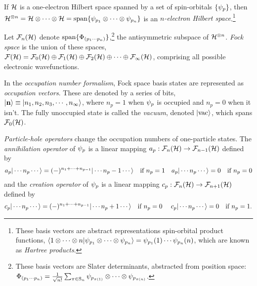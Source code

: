 \documentclass[11pt]{article}
\numberwithin{equation}{section}
\begin{document}
\begin{dfn}
If $\mathcal{H}$ is a one-electron Hilbert space spanned by a set of spin-orbitals $\{\psi _p\}$, then $\mathcal{H}^{\otimes n}=\mathcal{H}\otimes\cdots\otimes\mathcal{H}=\mathrm{span}\{\psi _{p_1}{}\otimes\cdots\otimes\psi _{p_n}\}$ is an \textit{$n$-electron Hilbert space}.\footnote{These basis vectors are abstract representations spin-orbital product functions, $\langle1\otimes\cdots\otimes n|\psi _{p_1}\otimes\cdots\otimes\psi _{p_n}\rangle=\psi _{p_1}(1)\cdots\psi _{p_n}(n)$, which are known as \textit{Hartree products}.}
\end{dfn}


\begin{dfn}\label{dfn:fock-space}
Let $\mathcal{F}_n(\mathcal{H})$ denote $\mathrm{span}\{\Phi _{(p_1\cdots p_n)}\}$,\footnote{
These basis vectors are Slater determinants, abstracted from position space:
$
  \F_{(p_1\cd p_n)}
=
  \fr{1}{\sqrt{n!}}
  \sum_{\pi\in\mr{S}_n}
  \y_{p_{\pi(1)}}\otimes\cd\otimes
  \y_{p_{\pi(n)}}
$.
}
the antisymmetric subspace of $\mathcal{H}^{\otimes n}$.
\textit{Fock space} is the union of these spaces, $\mathcal{F}(\mathcal{H})=\mathcal{F}_0(\mathcal{H})\oplus \mathcal{F}_1(\mathcal{H})\oplus \mathcal{F}_2(\mathcal{H})\oplus\cdots\oplus \mathcal{F}_{\infty}(\mathcal{H})$, comprising all possible electronic wavefunctions.
\end{dfn}

\begin{dfn}\label{occupation-number-representation}
In the \textit{occupation number formalism}, Fock space basis states are represented as \textit{occupation vectors}.
These are denoted by a series of bits,
$
  |\mathbf{n}\rangle
\equiv
  |n_1,n_2,n_3,\cdots,n_\infty\rangle
$,
where $n_p=1$ when $\psi _p$ is occupied and $n_p=0$ when it isn't.
The fully unoccupied state is called the \textit{vacuum}, denoted $|\mathrm{vac}\rangle$, which spans $\mathcal{F}_0(\mathcal{H})$.
\end{dfn}

\begin{dfn}\label{dfn:particle-hole-operators}
\textit{Particle-hole operators} change the occupation numbers of one-particle states.
The \textit{annihilation operator} of $\psi _p$ is a linear mapping $a_p:\mathcal{F}_n(\mathcal{H})\rightarrow \mathcal{F}_{n-1}(\mathcal{H})$ defined by
\begin{align}\label{eq:occ-num-annihilation-operator-action}
  a_p|\cdots n_p\cdots\rangle
=
  (-)^{n_1+\cdots+n_{p-1}}
  |\cdots n_p-1\cdots\rangle
\ \ \ \text{if $n_p=1$}
&&
  a_p|\cdots n_p\cdots\rangle
=
  0
\ \ \ \text{if $n_p=0$}
\end{align}
and the \textit{creation operator} of $\psi _p$ is a linear mapping $c_p:\mathcal{F}_n(\mathcal{H})\rightarrow \mathcal{F}_{n+1}(\mathcal{H})$ defined by
\begin{align}\label{eq:occ-num-creation-operator-action}
  c_p|\cdots n_p\cdots\rangle
=
  (-)^{n_1+\cdots+n_{p-1}}
  |\cdots n_p+1\cdots\rangle
\ \ \ \text{if $n_p=0$\ }
&&
  c_p|\cdots n_p\cdots\rangle
=
  0
\ \ \ \text{if $n_p=1$.}
\end{align}
\end{dfn}
\end{document}
